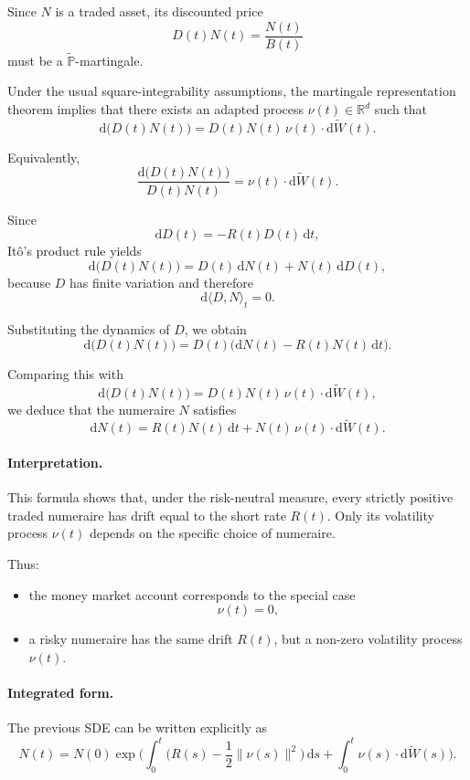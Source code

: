 \documentclass[11pt]{article}
\newcommand{\R}{\mathbb{R}}
\theoremstyle{definition}
\theoremstyle{plain}
\begin{document}
Since \(N\) is a traded asset, its discounted price
\[
D(t)N(t)=\frac{N(t)}{B(t)}
\]
must be a \(\widetilde{\mathbb P}\)-martingale.

Under the usual square-integrability assumptions, the martingale
representation theorem implies that there exists an adapted process
\(\nu(t)\in\R^d\) such that
\[
\mathrm{d}\big(D(t)N(t)\big)
=
D(t)N(t)\,\nu(t)\cdot \mathrm{d}\widetilde W(t).
\]

Equivalently,
\[
\frac{\mathrm{d}\big(D(t)N(t)\big)}{D(t)N(t)}
=
\nu(t)\cdot \mathrm{d}\widetilde W(t).
\]

Since
\[
\mathrm{d}D(t)=-R(t)D(t)\,\mathrm{d}t,
\]
It\^o's product rule yields
\[
\mathrm{d}\big(D(t)N(t)\big)
=
D(t)\,\mathrm{d}N(t)+N(t)\,\mathrm{d}D(t),
\]
because \(D\) has finite variation and therefore
\[
\mathrm{d}\langle D,N\rangle_t=0.
\]

Substituting the dynamics of \(D\), we obtain
\[
\mathrm{d}\big(D(t)N(t)\big)
=
D(t)\Big(\mathrm{d}N(t)-R(t)N(t)\,\mathrm{d}t\Big).
\]

Comparing this with
\[
\mathrm{d}\big(D(t)N(t)\big)
=
D(t)N(t)\,\nu(t)\cdot \mathrm{d}\widetilde W(t),
\]
we deduce that the numeraire \(N\) satisfies
\[
\boxed{
\mathrm{d}N(t)
=
R(t)N(t)\,\mathrm{d}t
+
N(t)\,\nu(t)\cdot \mathrm{d}\widetilde W(t).
}
\]

\paragraph{Interpretation.}

This formula shows that, under the risk-neutral measure, every strictly
positive traded numeraire has drift equal to the short rate \(R(t)\).
Only its volatility process \(\nu(t)\) depends on the specific choice of
numeraire.

Thus:
\begin{itemize}[leftmargin=1.4em]
\item the money market account corresponds to the special case
\[
\nu(t)=0,
\]
\item a risky numeraire has the same drift \(R(t)\), but a non-zero
volatility process \(\nu(t)\).
\end{itemize}

\paragraph{Integrated form.}

The previous SDE can be written explicitly as
\[
N(t)
=
N(0)\exp\!\Big(
\int_0^t \Big(R(s)-\frac12\|\nu(s)\|^2\Big)\,\mathrm{d}s
+
\int_0^t \nu(s)\cdot \mathrm{d}\widetilde W(s)
\Big).
\]
\end{document}
